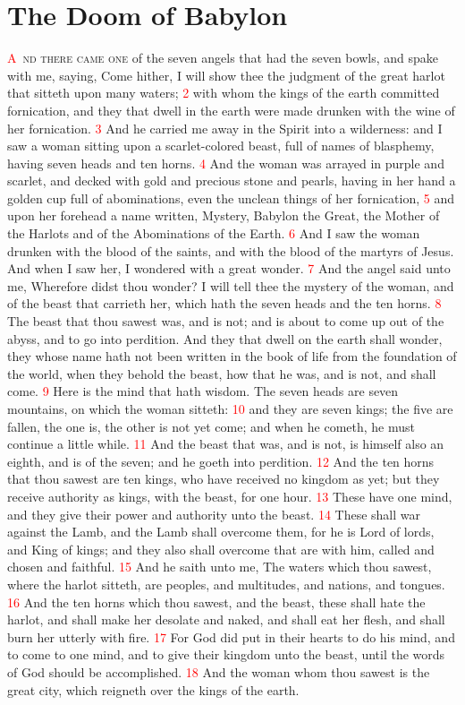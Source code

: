 \documentclass[12pt,twoside]{memoir}
\newcommand{\vnum}[1]{\textcolor{red}{\normalsize{#1}}}
\begin{document}
\chapter{The Doom of Babylon}
\lettrine[lines=3,slope=-0.5em]{\textcolor{red}{A}}{\ nd there came one} of the seven angels that had the seven bowls, and spake with me, saying, Come hither, I will show thee the judgment of the great harlot that sitteth upon many waters; 
\vnum{2} with whom the kings of the earth committed fornication, and they that dwell in the earth were made drunken with the wine of her fornication. 
\vnum{3} And he carried me away in the Spirit into a wilderness: and I saw a woman sitting upon a scarlet-colored beast, full of names of blasphemy, having seven heads and ten horns. 
\vnum{4} And the woman was arrayed in purple and scarlet, and decked with gold and precious stone and pearls, having in her hand a golden cup full of abominations, even the unclean things of her fornication, 
\vnum{5} and upon her forehead a name written, Mystery, Babylon the Great, the Mother of the Harlots and of the Abominations of the Earth. 
\vnum{6} And I saw the woman drunken with the blood of the saints, and with the blood of the martyrs of Jesus. And when I saw her, I wondered with a great wonder. 
\vnum{7} And the angel said unto me, Wherefore didst thou wonder? I will tell thee the mystery of the woman, and of the beast that carrieth her, which hath the seven heads and the ten horns. 
\vnum{8} The beast that thou sawest was, and is not; and is about to come up out of the abyss, and to go into perdition. And they that dwell on the earth shall wonder, they whose name hath not been written in the book of life from the foundation of the world, when they behold the beast, how that he was, and is not, and shall come. 
\vnum{9} Here is the mind that hath wisdom. The seven heads are seven mountains, on which the woman sitteth: 
\vnum{10} and they are seven kings; the five are fallen, the one is, the other is not yet come; and when he cometh, he must continue a little while. 
\vnum{11} And the beast that was, and is not, is himself also an eighth, and is of the seven; and he goeth into perdition. 
\vnum{12} And the ten horns that thou sawest are ten kings, who have received no kingdom as yet; but they receive authority as kings, with the beast, for one hour. 
\vnum{13} These have one mind, and they give their power and authority unto the beast. 
\vnum{14} These shall war against the Lamb, and the Lamb shall overcome them, for he is Lord of lords, and King of kings; and they also shall overcome that are with him, called and chosen and faithful. 
\vnum{15} And he saith unto me, The waters which thou sawest, where the harlot sitteth, are peoples, and multitudes, and nations, and tongues. 
\vnum{16} And the ten horns which thou sawest, and the beast, these shall hate the harlot, and shall make her desolate and naked, and shall eat her flesh, and shall burn her utterly with fire. 
\vnum{17} For God did put in their hearts to do his mind, and to come to one mind, and to give their kingdom unto the beast, until the words of God should be accomplished. 
\vnum{18} And the woman whom thou sawest is the great city, which reigneth over the kings of the earth.
\end{document}
